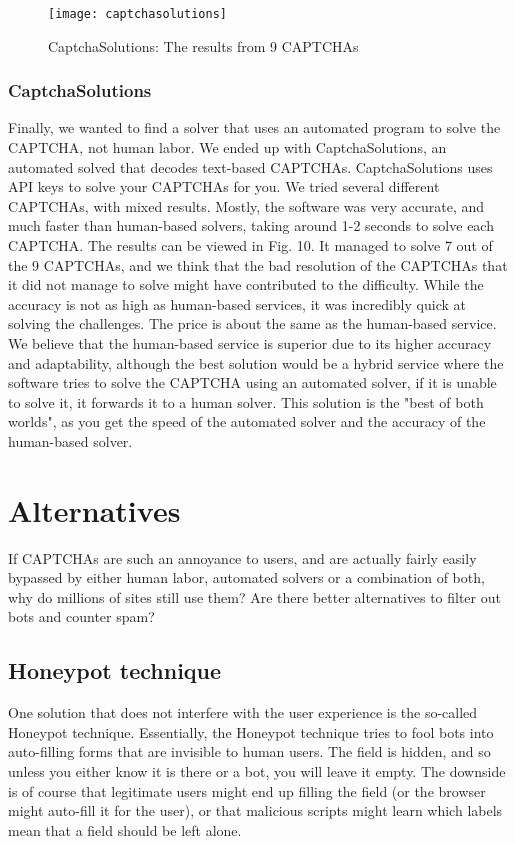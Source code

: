 \documentclass[a4paper]{IEEEtran}
\begin{document}
\begin{figure}[t]
\center
\texttt{[image: captchasolutions]}
\caption{CaptchaSolutions: The results from 9 CAPTCHAs}
\label{CaptchaSolutions}
\end{figure}

\subsubsection{CaptchaSolutions}
Finally, we wanted to find a solver that uses an automated program to solve the CAPTCHA, not human labor. We ended up with CaptchaSolutions, an automated solved that decodes text-based CAPTCHAs. CaptchaSolutions uses API keys to solve your CAPTCHAs for you. We tried several different CAPTCHAs, with mixed results. Mostly, the software was very accurate, and much faster than human-based solvers, taking around 1-2 seconds to solve each CAPTCHA. The results can be viewed in Fig. 10. It managed to solve 7 out of the 9 CAPTCHAs, and we think that the bad resolution of the CAPTCHAs that it did not manage to solve might have contributed to the difficulty. While the accuracy is not as high as human-based services, it was incredibly quick at solving the challenges. The price is about the same as the human-based service. We believe that the human-based service is superior due to its higher accuracy and adaptability, although the best solution would be a hybrid service where the software tries to solve the CAPTCHA using an automated solver, if it is unable to solve it, it forwards it to a human solver. This solution is the "best of both worlds", as you get the speed of the automated solver and the accuracy of the human-based solver. 

\section{Alternatives}
If CAPTCHAs are such an annoyance to users, and are actually fairly easily bypassed by either human labor, automated solvers or a combination of both, why do millions of sites still use them? Are there better alternatives to filter out bots and counter spam? 

\subsection{Honeypot technique}
One solution that does not interfere with the user experience is the so-called Honeypot technique. Essentially, the Honeypot technique tries to fool bots into auto-filling forms that are invisible to human users. The field is hidden, and so unless you either know it is there or a bot, you will leave it empty. The downside is of course that legitimate users might end up filling the field (or the browser might auto-fill it for the user), or that malicious scripts might learn which labels mean that a field should be left alone.
\end{document}
